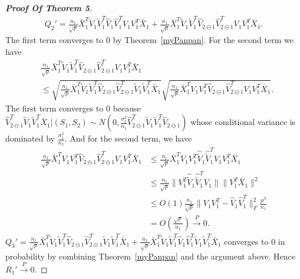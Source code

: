 \begin{proof}[\textbf{Proof Of Theorem 5}]
    \begin{equation*}
    \begin{aligned}
        Q_2'=\frac{n_1}{\sqrt{p}}\bar{X}_1^T \tilde{V}_1\tilde{V}_1^T\hat{V}_1\hat{V}_1^T V_1V_1^T \bar{X}_1
        +\frac{n_1}{\sqrt{p}}\bar{X}_1^T \tilde{V}_1\tilde{V}_1^T\hat{V}_{2\ominus 1}\hat{V}_{2\ominus 1}^T V_1V_1^T \bar{X}_1.
        \end{aligned}
    \end{equation*}
    The first term converges to $0$ by Theorem~\ref{myPanpan}.  For the second term we have
    \begin{equation*}
    \begin{aligned}
&\frac{n_1}{\sqrt{p}}\bar{X}_1^T \tilde{V}_1\tilde{V}_1^T\hat{V}_{2\ominus 1}\hat{V}_{2\ominus 1}^T V_1V_1^T \bar{X}_1\\
&\leq
\sqrt{\frac{n_1}{\sqrt{p}}\bar{X}_1^T \tilde{V}_1\tilde{V}_1^T\hat{V}_{2\ominus 1}\hat{V}_{2\ominus 1}^T \tilde{V}_1\tilde{V}_1^T \bar{X}_1}\sqrt{\frac{n_1}{\sqrt{p}}\bar{X}_1^T {V}_1{V}_1^T\hat{V}_{2\ominus 1}\hat{V}_{2\ominus 1}^T V_1V_1^T \bar{X}_1}.
    \end{aligned}
    \end{equation*}
The first term converges to $0$ because $\hat{V}_{2\ominus 1}^T \tilde{V}_1\tilde{V}_1^T \bar{X}_1|(S_1,S_2)\sim N(0,\frac{\sigma_1^2}{n_1}\hat{V}_{2\ominus 1}^T \tilde{V}_1\tilde{V}_1^T\hat{V}_{2\ominus 1})$ whose conditional variance is dominated by $\frac{\sigma^2_1}{n_1}$. And for the second term, we have
\begin{equation*}
\begin{aligned}
\frac{n_1}{\sqrt{p}}\bar{X}_1^T {V}_1{V}_1^T\hat{V}_{2\ominus 1}\hat{V}_{2\ominus 1}^T V_1V_1^T \bar{X}_1
&\leq
\frac{n_1}{\sqrt{p}}\bar{X}_1^T {V}_1{V}_1^T\hat{\tilde{V}}_{1}\hat{\tilde{V}}_{1}^T V_1V_1^T \bar{X}_1\\
&\leq
\frac{n_1}{\sqrt{p}}\|{V}_1^T\hat{\tilde{V}}_{1}\hat{\tilde{V}}_{1}^T V_1\|\|V_1^T \bar{X}_1\|^2\\
&\leq O(1)\frac{n_1}{\sqrt{p}}\|V_1 V_1^T -\hat{V}_1\hat{V}_1^T\|^2_F \frac{p^{\beta}}{n_1}\\
&=O(\frac{\sqrt{p}}{n_1})\xrightarrow{P}0.
\end{aligned}
\end{equation*}
$Q_3'=
\frac{n_1}{\sqrt{p}}\bar{X}_1^T \tilde{V}_1\tilde{V}_1^T\hat{V}_{2\ominus 1}\hat{V}_{2\ominus 1}^T \tilde{V}_1\tilde{V}_1^T \bar{X}_1+
\frac{n_1}{\sqrt{p}}\bar{X}_1^T \tilde{V}_1\tilde{V}_1^T\hat{V}_{1}\hat{V}_{1}^T \tilde{V}_1\tilde{V}_1^T \bar{X}_1$
    converges to $0$ in probability by combining Theorem~\ref{myPanpan} and the argument above. Hence $R_1'\xrightarrow{P}0$.


\end{proof}
